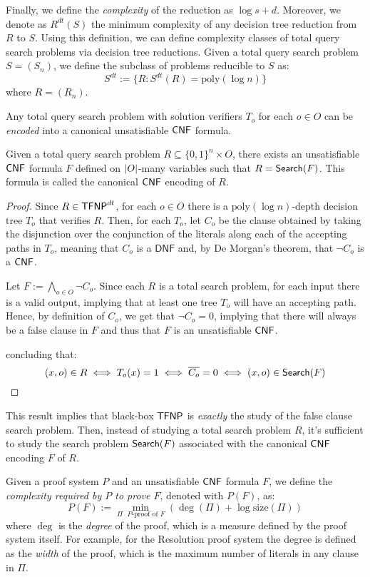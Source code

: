 Finally, we define the \textit{complexity} of the reduction as $\log s + d$. Moreover, we denote as $R^{dt}(S)$ the minimum complexity of any decision tree reduction from $R$ to $S$. Using this definition, we can define complexity classes of total query search problems via decision tree reductions. Given a total query search problem $S = (S_n)$, we define the subclass of problems reducible to $S$ as:
\[S^{dt} := \{R : S^{dt}(R) = \mathrm{poly}(\log n)\}\]
where $R = (R_n)$.

Any total query search problem  with solution verifiers $T_o$ for each $o \in O$ can be \textit{encoded} into a canonical unsatisfiable $\mathsf{CNF}$ formula. 

\begin{proposition}
    Given a total query search problem $R \subseteq \{0,1\}^n \times O$, there exists an unsatisfiable $\mathsf{CNF}$ formula $F$ defined on $\left|O\right|$-many variables such that $R = \mathsf{Search}(F)$. This formula is called the canonical $\mathsf{CNF}$ encoding of $R$.
\end{proposition}

\begin{proof}
    Since $R \in \mathsf{TFNP}^{dt}$, for each $o \in O$ there is a $\mathrm{poly}(\log n)$-depth decision tree $T_o$ that verifies $R$. Then, for each $T_o$, let $C_o$ be the clause obtained by taking the disjunction over the conjunction of the literals along each of the accepting paths in $T_o$, meaning that $C_o$ is a $\mathsf{DNF}$ and, by De Morgan's theorem, that $\lnot{C_o}$ is a $\mathsf{CNF}$.

    Let $F := \bigwedge\limits_{o \in O} \lnot{C_o}$. Since each $R$ is a total search problem, for each input there is a valid output, implying that at least one tree $T_o$ will have an accepting path. Hence, by definition of $C_o$, we get that $\lnot{C_o} = 0$, implying that there will always be a false clause in $F$ and thus that $F$ is an unsatisfiable $\mathsf{CNF}$.
    
    concluding that:
    \[(x,o) \in R \iff T_o(x) = 1 \iff \overline{C_o} = 0 \iff (x,o) \in \mathsf{Search}(F)\]
\end{proof}

This result implies that black-box $\mathsf{TFNP}$ is \textit{exactly} the study of the false clause search problem. Then, instead of studying a total search problem $R$, it's sufficient to study the search problem $\mathsf{Search}(F)$ associated with the canonical $\mathsf{CNF}$ encoding $F$ of $R$.

Given a proof system $P$ and an unsatisfiable $\mathsf{CNF}$ formula $F$, we define the \textit{complexity required by $P$ to prove $F$}, denoted with $P(F)$, as:
\[P(F) := \min_{\Pi \text{ $P$-proof of $F$}}(\deg(\Pi) + \log \mathrm{size}(\Pi))\]
where $\deg$ is the \textit{degree} of the proof, which is a measure defined by the proof system itself. For example, for the Resolution proof system the degree is defined as the \textit{width} of the proof, which is the maximum number of literals in any clause in $\Pi$.

